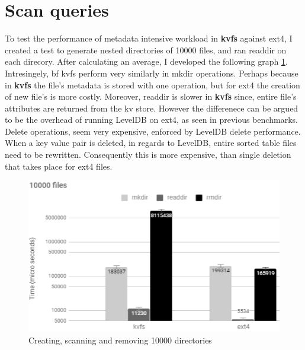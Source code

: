 \documentclass[bsc,frontabs,twoside,singlespacing,parskip,deptreport]{infthesis}     %
\begin{document}
{\section{Scan queries}
To test the performance of metadata intensive workload in {\bf kvfs} against ext4, I created a test to generate nested directories of 10000 files, and ran readdir on  each direcory. After calculating an average, I developed the following graph \ref{fig:readdir}. Intresingely, {bf kvfs} perform very similarly in mkdir operations. Perhaps because in {\bf kvfs} the file's metadata is stored with one operation, but for ext4 the creation of new file's is more costly. Moreover, readdir is slower in {\bf kvfs} since, entire file's attributes are returned from the kv store. However  the differenece can be argued to be the overhead of running LevelDB on ext4, as seen in previous benchmarks. Delete operations, seem very expensive, enforced by LevelDB delete performance. When a key value pair is deleted, in regards to LevelDB, entire sorted table files need to be rewritten. Consequently this is more expensive, than single deletion that takes place for ext4 files. 

\begin{figure}[h!]
	\centering
 	\includegraphics[scale=1]{diagrams/readdir.png}
	\caption{Creating, scanning and removing 10000 directories}
	 \label{fig:readdir}
\end{figure}

}
\end{document}
